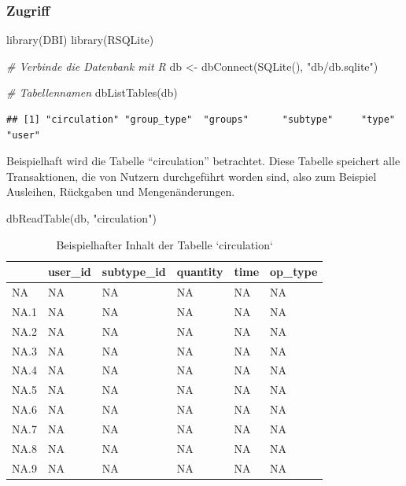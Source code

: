 \documentclass[
]{article}
\newenvironment{Shaded}{\begin{snugshade}}{\end{snugshade}}
\newcommand{\CommentTok}[1]{\textcolor[rgb]{0.56,0.35,0.01}{\textit{#1}}}
\newcommand{\FunctionTok}[1]{\textcolor[rgb]{0.00,0.00,0.00}{#1}}
\newcommand{\NormalTok}[1]{#1}
\newcommand{\OtherTok}[1]{\textcolor[rgb]{0.56,0.35,0.01}{#1}}
\newcommand{\StringTok}[1]{\textcolor[rgb]{0.31,0.60,0.02}{#1}}
\begin{document}
\hypertarget{zugriff}{%
\subsubsection{Zugriff}\label{zugriff}}

\begin{Shaded}
\begin{Highlighting}[]
\FunctionTok{library}\NormalTok{(DBI)}
\FunctionTok{library}\NormalTok{(RSQLite)}

\CommentTok{\# Verbinde die Datenbank mit R}
\NormalTok{db }\OtherTok{\textless{}{-}} \FunctionTok{dbConnect}\NormalTok{(}\FunctionTok{SQLite}\NormalTok{(), }\StringTok{"db/db.sqlite"}\NormalTok{)}

\CommentTok{\# Tabellennamen}
\FunctionTok{dbListTables}\NormalTok{(db)}
\end{Highlighting}
\end{Shaded}

\begin{verbatim}
## [1] "circulation" "group_type"  "groups"      "subtype"     "type"        "user"
\end{verbatim}

Beispielhaft wird die Tabelle ``circulation'' betrachtet. Diese Tabelle speichert alle Transaktionen, die von Nutzern durchgeführt worden sind, also zum Beispiel Ausleihen, Rückgaben und Mengenänderungen.

\begin{Shaded}
\begin{Highlighting}[]
\FunctionTok{dbReadTable}\NormalTok{(db, }\StringTok{"circulation"}\NormalTok{)}
\end{Highlighting}
\end{Shaded}

\begin{table}

\caption{\label{tab:unnamed-chunk-9}Beispielhafter Inhalt der Tabelle `circulation`}
\centering
\begin{tabu} to 
\toprule
  & user\_id & subtype\_id & quantity & time & op\_type\\
\midrule
NA & NA & NA & NA & NA & NA\\
NA.1 & NA & NA & NA & NA & NA\\
NA.2 & NA & NA & NA & NA & NA\\
NA.3 & NA & NA & NA & NA & NA\\
NA.4 & NA & NA & NA & NA & NA\\
\addlinespace
NA.5 & NA & NA & NA & NA & NA\\
NA.6 & NA & NA & NA & NA & NA\\
NA.7 & NA & NA & NA & NA & NA\\
NA.8 & NA & NA & NA & NA & NA\\
NA.9 & NA & NA & NA & NA & NA\\
\bottomrule
\end{tabu}
\end{table}
\end{document}
